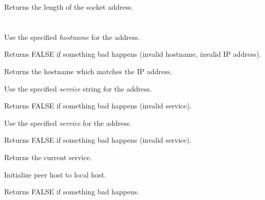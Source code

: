 Returns the length of the socket address.

\section{}\label{wxipv4address}





%
%


Use the specified {\it hostname} for the address.


Returns FALSE if something bad happens (invalid hostname, invalid IP address). 

%
%


Returns the hostname which matches the IP address.

%
%


Use the specified {\it service} string for the address.


Returns FALSE if something bad happens (invalid service).

%
%


Use the specified {\it service} for the address.


Returns FALSE if something bad happens (invalid service).

%
%


Returns the current service.

%
%


Initialize peer host to local host.


Returns FALSE if something bad happens.

